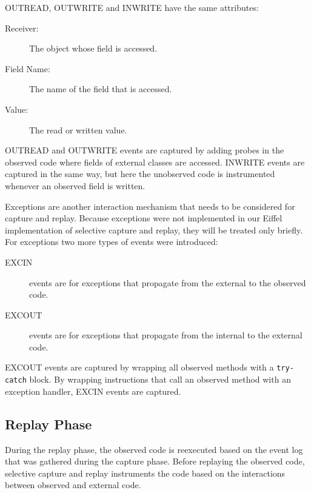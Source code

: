 OUTREAD, OUTWRITE and INWRITE have the same attributes:

\begin{description}
 \item [Receiver:] The object whose field is accessed.
 \item [Field Name:] The name of the field that is accessed.
 \item [Value:] The read or written value.
\end{description}

OUTREAD and OUTWRITE events are captured by adding probes in the observed code where fields of external classes are accessed. INWRITE events are captured in the same way, but here the unobserved code is instrumented whenever an observed field is written. 

Exceptions are another interaction mechanism that needs to be considered for capture and replay. Because exceptions were not implemented in our Eiffel implementation of selective capture and replay, they will be treated only briefly. For exceptions two more types of events were introduced:
\begin{description}
 \item [EXCIN] events are for exceptions that propagate from the external to the observed code.
 \item [EXCOUT] events are for exceptions that propagate from the internal to the external code.
\end{description}
EXCOUT events are captured by wrapping all observed methods with a \texttt{try-catch} block. By wrapping instructions that call an observed method with an exception handler,  EXCIN events are captured.

\subsection{Replay Phase}
During the replay phase, the observed code is reexecuted based on the event log that was gathered during the capture phase. Before replaying the observed code, selective capture and replay instruments the code based on the interactions between observed and external code. 

